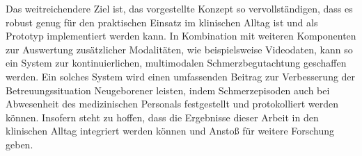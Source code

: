 Das weitreichendere Ziel ist, das vorgestellte Konzept so vervollständigen, dass es robust genug für den praktischen Einsatz im klinischen Alltag ist und als Prototyp implementiert werden kann. In Kombination mit weiteren Komponenten zur Auswertung zusätzlicher Modalitäten, wie beispielsweise Videodaten, kann so ein System zur kontinuierlichen, multimodalen Schmerzbegutachtung geschaffen werden. Ein solches System wird einen umfassenden Beitrag zur Verbesserung der Betreuungssituation Neugeborener leisten, indem Schmerzepisoden auch bei Abwesenheit des medizinischen Personals festgestellt und protokolliert werden können. Insofern steht zu hoffen, dass die Ergebnisse dieser Arbeit in den klinischen Alltag integriert werden können und Anstoß für weitere Forschung geben.